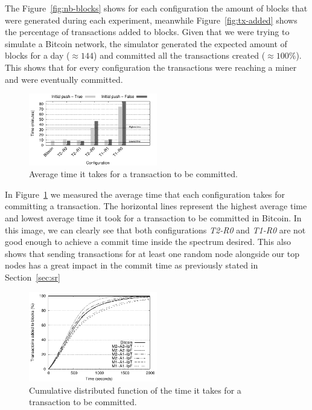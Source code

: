 \documentclass{dads}   %
\begin{document}
The Figure~\ref{fig:nb-blocks} shows for each configuration the amount of blocks that were generated during each experiment, meanwhile Figure~\ref{fig:tx-added} shows the percentage of transactions added to blocks. Given that we were trying to simulate a Bitcoin network, the simulator generated the expected amount of blocks for a day ($\approx 144$) and committed all the transactions created ($\approx 100\%$). This shows that for every configuration the transactions were reaching a miner and were eventually committed.

\begin{figure}[t]
\centering
\includegraphics[width=0.5\textwidth]{plots/commit-time.pdf}
\caption{Average time it takes for a transaction to be committed.}
\label{fig:commit-time}
\end{figure}

In Figure~\ref{fig:commit-time} we measured the average time that each configuration takes for committing a transaction. The horizontal lines represent the highest average time and lowest average time it took for a transaction to be committed in Bitcoin. In this image, we can clearly see that both configurations \textsl{T2-R0} and \textsl{T1-R0} are not good enough to achieve a commit time inside the spectrum desired. This also shows that sending transactions for at least one random node alongside our top nodes has a great impact in the commit time as previously stated in Section~\ref{sec:sr}

\begin{figure}[t]
\centering
\includegraphics[width=0.5\textwidth]{plots/cdf_commit.pdf}
\caption{Cumulative distributed function of the time it takes for a transaction to be committed.}
\label{fig:cdf-commit}
\end{figure}
\end{document}
